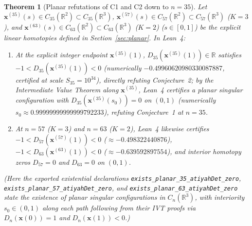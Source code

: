 \documentclass[11pt,reqno]{amsart}
\newtheorem{theorem}{Theorem}[section]
\theoremstyle{remark}
\newcommand{\R}{\mathbb{R}}
\begin{document}
\begin{theorem}[Planar refutations of C1 and C2 down to $n = 35$]\label{thm:main-c12}
Let $\mathbf{x}^{(35)}(s) \in C_{35}(\R^2) \subset C_{35}(\R^3)$, $\mathbf{x}^{(57)}(s) \in C_{57}(\R^2) \subset C_{57}(\R^3)$ ($K = 3$), and $\mathbf{x}^{(63)}(s) \in C_{63}(\R^2) \subset C_{63}(\R^3)$ ($K = 2$) ($s \in [0, 1]$) be the explicit linear homotopies defined in Section~\ref{sec:planar}.
In Lean~4:
\begin{enumerate}
  \item At the explicit integer endpoint $\mathbf{x}^{(35)}(1)$, $D_{35}(\mathbf{x}^{(35)}(1)) \in \R$ satisfies $-1 < D_{35}(\mathbf{x}^{(35)}(1)) < 0$ (numerically $-0.49960620980330087887$, certified at scale $S_{35} = 10^{34}$), directly refuting Conjecture~2; by the Intermediate Value Theorem along $\mathbf{x}^{(35)}$, Lean~4 certifies a planar singular configuration with $D_{35}(\mathbf{x}^{(35)}(s_0)) = 0$ on $(0, 1)$ (numerically $s_0 \approx 0.99999999999999792233$), refuting Conjecture~1 at $n = 35$.
  \item At $n = 57$ ($K=3$) and $n = 63$ ($K=2$), Lean~4 likewise certifies $-1 < D_{57}(\mathbf{x}^{(57)}(1)) < 0$ ($\approx -0.498322440876$), $-1 < D_{63}(\mathbf{x}^{(63)}(1)) < 0$ ($\approx -0.639592897554$), and interior homotopy zeros $D_{57} = 0$ and $D_{63} = 0$ on $(0, 1)$.
\end{enumerate}
(Here the exported existential declarations \texttt{exists\_planar\_35\_atiyahDet\_zero}, \texttt{exists\_planar\_57\_atiyahDet\_zero}, and \texttt{exists\_planar\_63\_atiyahDet\_zero} state the existence of planar singular configurations in $C_n(\R^3)$, with interiority $s_0 \in (0, 1)$ along each path following from their IVT proofs via $D_n(\mathbf{x}(0)) = 1$ and $D_n(\mathbf{x}(1)) < 0$.)
\end{theorem}
\end{document}

